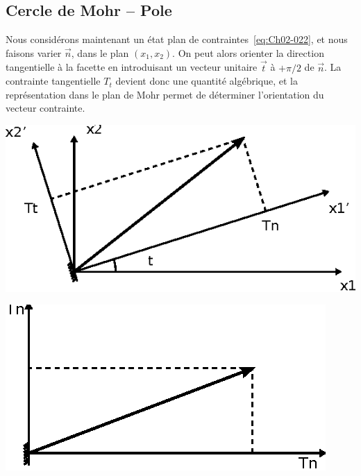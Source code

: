 \subsection{Cercle de Mohr -- Pole} \label{ssec:Ch02-3.2}
Nous considérons maintenant un état plan de contraintes~\eqref{eq:Ch02-022}, et nous faisons varier $\vec{n}$, dans le plan $\left( x_1,x_2 \right)$.
On peut alors orienter la direction tangentielle à la facette en introduisant un vecteur unitaire $\vec{t}$ à $+\pi/2$ de $\vec{n}$.
La contrainte tangentielle $T_t$ devient donc une quantité algébrique, et la représentation dans le plan de Mohr permet de déterminer l'orientation du vecteur contrainte. 
\begin{multicols}{2}
    \begin{center}
        \includegraphics{../images/T1_Ch02-0016a}
    \end{center}
    \columnbreak
    \begin{center}
        \includegraphics{../images/T1_Ch02-0016b}
    \end{center}
\end{multicols}
